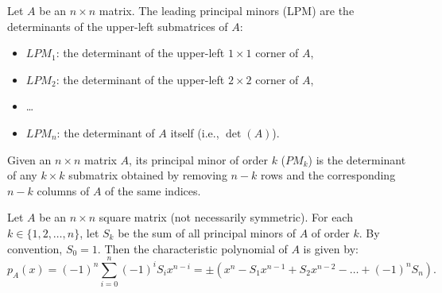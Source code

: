 \begin{definition}
	Let $A$ be an $n \times n$ matrix. The leading principal minors (LPM) are the determinants of the upper-left submatrices of $A$:
	\begin{itemize}
		\item $LPM_1$: the determinant of the upper-left $1 \times 1$ corner of $A$,
		\item $LPM_2$: the determinant of the upper-left $2 \times 2$ corner of $A$,
		\item \dots
		\item $LPM_n$: the determinant of $A$ itself (i.e., $\det(A)$).
	\end{itemize}
\end{definition}

\begin{definition}
	Given an $n \times n$ matrix $A$, its principal minor of order $k$ ($PM_k$) is the determinant of any $k \times k$ submatrix obtained by removing $n-k$ rows and the corresponding $n-k$ columns of $A$ of the same indices.
\end{definition}

\begin{theorem}
	Let $A$ be an $n \times n$ square matrix (not necessarily symmetric). For each $k \in \{1, 2, \dots, n\}$, let $S_k$ be the sum of all principal minors of $A$ of order $k$. By convention, $S_0 = 1$. Then the characteristic polynomial of $A$ is given by:
	\[
		p_A(x) = (-1)^n \sum_{i=0}^n (-1)^i S_i x^{n-i} = \pm \left(x^n - S_1 x^{n-1} + S_2 x^{n-2} - \dots + (-1)^n S_n\right).
	\]
\end{theorem}

